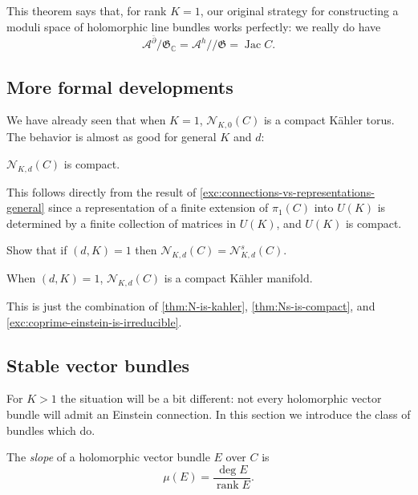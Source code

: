 \documentclass[12pt,letterpaper,reqno]{article}
\numberwithin{equation}{section}
\newcommand{\fG}{{\mathfrak G}}
\newcommand{\cN}{\ensuremath{\mathcal N}}
\newcommand{\cA}{\ensuremath{\mathcal A}}
\newcommand{\C}{\ensuremath{\mathbb C}}
\newcommand{\kahler}{K\"ahler\xspace}
\newcommand{\kq}{/\!\!/}
\newcommand{\ti}[1]{\textit{#1}}
\DeclareMathOperator{\rank}{rank}
\DeclareMathOperator{\Jac}{Jac}
\begin{document}
This theorem says that, for rank $K=1$, our original strategy
for constructing a moduli space of holomorphic line bundles
works perfectly: we really do have
\begin{equation}
  \cA^{\bar\partial} / \fG_\C = \cA^h \kq \fG = \Jac C.
\end{equation}


\subsection{More formal developments}


We have already seen that when $K=1$, $\cN_{K,0}(C)$ is a compact
\kahler torus. The behavior is almost as good
for general $K$ and $d$:

\begin{cor}[Compactness of $\cN_{K,d}(C)$] \label{thm:Ns-is-compact}
$\cN_{K,d}(C)$ is compact.
\end{cor}
\begin{pf} This follows directly from the result of 
\autoref{exc:connections-vs-representations-general}
since a representation of a finite extension of $\pi_1(C)$ into 
$U(K)$ is determined by a finite collection of matrices in $U(K)$,
and $U(K)$ is compact.
\end{pf}

\begin{exercise} \label{exc:coprime-einstein-is-irreducible} 
Show that if $(d,K)=1$ then $\cN_{K,d}(C) = \cN_{K,d}^s(C)$. 
\end{exercise}

\begin{cor}[$\cN_{K,d}(C)$ is nice when $(d,K)$ = 1]
When $(d,K) = 1$, $\cN_{K,d}(C)$ is a compact
\kahler manifold.
\end{cor}
\begin{pf} This is just the combination of \autoref{thm:N-is-kahler},
\autoref{thm:Ns-is-compact}, and 
\autoref{exc:coprime-einstein-is-irreducible}.
\end{pf}


\subsection{Stable vector bundles}

For $K > 1$ the situation will be a bit different:
not every holomorphic vector bundle will admit an Einstein connection.
In this section we introduce the class of bundles which do.

\begin{defn} The \ti{slope} of a holomorphic vector bundle $E$ over $C$ is
\begin{equation}
  \mu(E) = \frac{\deg E}{\rank E}.
\end{equation}
\end{defn}
\end{document}
